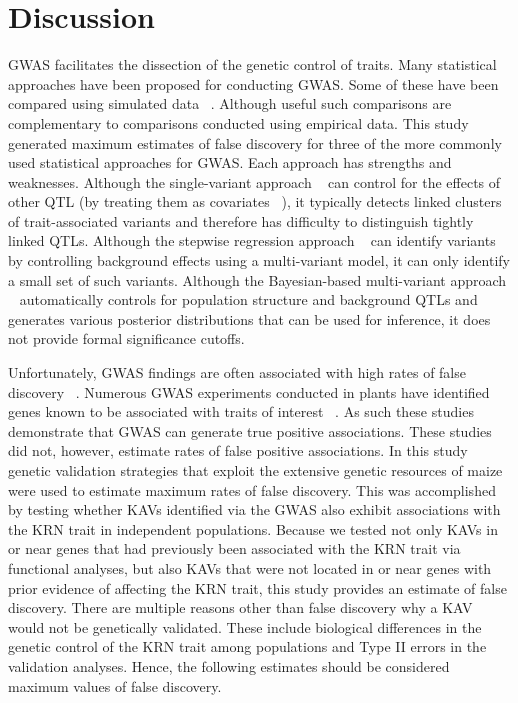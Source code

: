 \documentclass[10pt,letterpaper]{article}
\begin{document}

\section*{Discussion}
GWAS facilitates the dissection of the genetic control of traits. Many statistical approaches have been proposed for conducting GWAS. Some of these have been compared using simulated data ~\cite{Galesloot2014}. Although useful such comparisons are complementary to comparisons conducted using empirical data.  This study generated maximum estimates of false discovery for three of the more commonly used statistical approaches for GWAS. Each approach has strengths and weaknesses. Although the single-variant approach ~\cite{Balding2006} can control for the effects of other QTL (by treating them as covariates ~\cite{Kang2010}), it typically detects linked clusters of trait-associated variants and therefore has difficulty to distinguish tightly linked QTLs. Although the stepwise regression approach ~\cite{Segura2012} can identify variants by controlling background effects using a multi-variant model, it can only identify a small set of such variants. Although the Bayesian-based multi-variant approach ~\cite{Habier2011} automatically controls for population structure and background QTLs and generates various posterior distributions that can be used for inference, it does not provide formal significance cutoffs. 

Unfortunately, GWAS findings are often associated with high rates of false discovery ~\cite{Visscher2012}. Numerous GWAS experiments conducted in plants have identified genes known to be associated with traits of interest ~\cite{Larsson2013}. As such these studies demonstrate that GWAS can generate true positive associations. These studies did not, however, estimate rates of false positive associations. In this study genetic validation strategies that exploit the extensive genetic resources of maize were used to estimate maximum rates of false discovery. This was accomplished by testing whether KAVs identified via the GWAS also exhibit associations with the KRN trait in independent populations. Because we tested not only KAVs in or near genes that had previously been associated with the KRN trait via functional analyses, but also KAVs that were not located in or near genes with prior evidence of affecting the KRN trait, this study provides an estimate of false discovery. There are multiple reasons other than false discovery why a KAV would not be genetically validated. These include biological differences in the genetic control of the KRN trait among populations and Type II errors in the validation analyses. Hence, the following estimates should be considered maximum values of false discovery.
\end{document}
